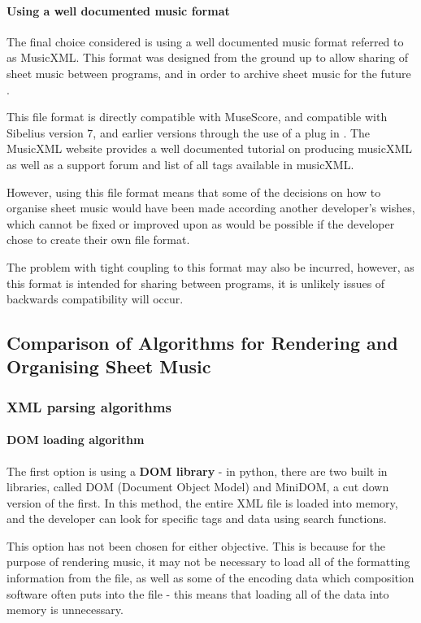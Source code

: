 \paragraph{Using a well documented music format}
The final choice considered is using a well documented music format referred to as MusicXML. This format was designed from the ground up to allow sharing of sheet music between programs, and in order to archive sheet music for the future \parencite{mxml}.

This file format is directly compatible with MuseScore\parencite{MuseTour}, and compatible with Sibelius version 7, and earlier versions through the use of a plug in \parencite{Plugin}. The MusicXML website provides a well documented tutorial on producing musicXML as well as a support forum and list of all tags available in musicXML.

However, using this file format means that some of the decisions on how to organise sheet music would have been made according another developer's wishes, which cannot be fixed or improved upon as would be possible if the developer chose to create their own file format.

The problem with tight coupling to this format may also be incurred, however, as this format is intended for sharing between programs, it is unlikely issues of backwards compatibility will occur.

\subsection{Comparison of Algorithms for Rendering and Organising Sheet Music}
\subsubsection{XML parsing algorithms}
\paragraph{DOM loading algorithm}
The first option is using a \textbf{DOM library} - in python, there are two built in libraries, called DOM (Document Object Model) and MiniDOM, a cut down version of the first. In this method, the entire XML file is loaded into memory, and the developer can look for specific tags and data using search functions.

This option has not been chosen for either objective. This is because for the purpose of rendering music, it may not be necessary to load all of the formatting information from the file, as well as some of the encoding data which composition software often puts into the file - this means that loading all of the data into memory is unnecessary. 


